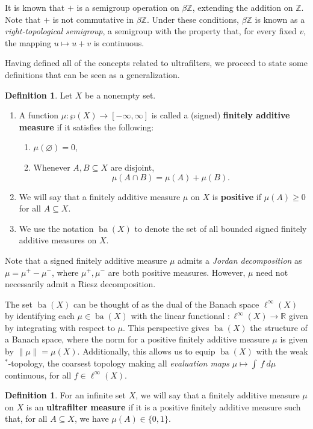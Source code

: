 \documentclass{jloganal}
\theoremstyle{definition}
\newtheorem{defn}[thm]{Definition}    %
\newcommand{\ba}{\mathop{\mathrm{ba}}}
\begin{document}
It is known that $+$ is a semigroup operation on $\beta\mathbb Z$, extending the addition on $\mathbb Z$. Note that $+$ is not commutative in $\beta\mathbb Z$. Under these conditions, $\beta\mathbb Z$ is known as a {\it right-topological semigroup}, a semigroup with the property that, for every fixed $v$, the mapping $u\longmapsto u+v$ is continuous.

Having defined all of the concepts related to ultrafilters, we proceed to state some definitions that can be seen as a generalization. 
\begin{defn}
    Let $X$ be a nonempty set.
    \begin{enumerate}
        \item A function $\mu\colon \wp(X)\longrightarrow [-\infty,\infty]$ is called a (signed) {\bf finitely additive measure} if it satisfies the following:
\begin{enumerate}
    \item 
    $\mu(\varnothing)=0$,
    \item 
    Whenever $A,B\subseteq X$ are disjoint, 
    \[
    \mu(A\cap B)=\mu(A) + \mu(B).
    \]
\end{enumerate}
    \item We will say that a finitely additive measure $\mu$ on $X$ is {\bf positive} if $\mu(A)\geq 0$ for all $A\subseteq X$.
    \item We use the notation $\ba(X)$ to denote the set of all bounded signed finitely additive measures on $X$.
    \end{enumerate}
\end{defn}

Note that a signed finitely additive measure $\mu$ admits a {\it Jordan decomposition} as $\mu=\mu^+-\mu^-$, where $\mu^+,\mu^-$ are both positive measures. However, $\mu$ need not necessarily admit a Riesz decomposition.

The set $\ba(X)$ can be thought of as the dual of the Banach space $\ell^\infty(X)$ by identifying each $\mu\in\ba(X)$ with the linear functional $:\ell^\infty(X)\longrightarrow\mathbb R$ given by integrating with respect to $\mu$. This perspective gives $\ba(X)$ the structure of a Banach space, where the norm for a positive finitely additive measure $\mu$ is given by $\|\mu\|=\mu(X)$. Additionally, this allows us to equip $\ba(X)$ with the weak$^{*}$-topology, the coarsest topology making all {\it evaluation maps} $\mu\longmapsto\int\ f\ d\mu$ continuous, for all $f\in\ell^\infty(X)$.

\begin{defn}
    For an infinite set $X$, we will say that a finitely additive measure $\mu$ on $X$ is an {\bf ultrafilter measure} if it is a positive finitely additive measure such that, for all $A\subseteq X$, we have $\mu(A)\in\{0,1\}$.
\end{defn}
\end{document}
